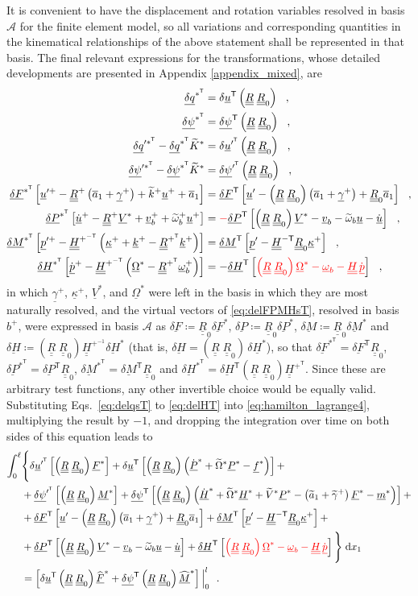 \documentclass[12pt,a4paper,oneside,english]{abntex2} %
\newcommand{\fix}[1]{{\color{red}#1}}
\newcommand{\vect}[1]{\underline{#1}}
\newcommand{\uvec}[1]{\overline{#1}}
\def\tens#1{\underline{\underline{#1}}}
\def\til#1{\widetilde{#1}}
\def\lb{\left[}
\def\rb{\right]}
\def\lp{\left(}
\def\rp{\right)}
\def\T{\mathsf{T}}
\def\A{\mathcal{A}}
\def\bp{b^+}
\def\xo{x_1}
\def\aone{\uvec{a}_1}
\def\aonetil{\til{a}_1}
\def\R{\tens{R}}
\def\Rp{\R^+}
\def\RpT{\R^{+^\T}}
\def\Rz{\R_0}
\def\u{\vect{u}}
\def\uT{\u^\T}
\def\uplus{\u^{+}}
\def\udot{\dot{\u}}
\def\updot{\dot{\u}^{+}}
\def\uprime{\u^{\prime}}
\def\uprimeT{\u^{\prime^\T}}
\def\upprime{\u^{\prime+}}
\def\vb{\vect{v}_b}
\def\vbplus{\vb^{+}}
\def\om{\vect{\omega}_b}
\def\omp{\om^{+}}
\def\omtil{\til{\omega}_b}
\def\omtilp{\omtil^{+}}
\def\gam{\vect{\gamma}}
\def\gamp{\gam^{+}}
\def\gamptil{\til{\gamma}^{+}}
\def\kap{\vect{\kappa}}
\def\kapp{\kap^{+}}
\def\k{\vect{k}}
\def\kp{\k^{+}}
\def\ktil{\til{k}}
\def\ktilp{\ktil^{+}}
\def\Ktil{\til{K}}
\def\Ktils{\Ktil^{*}}
\def\V{\vect{V}}
\def\Vs{\V^{*}}
\def\Vtils{\til{V}^{*}}
\def\Om{\vect{\Omega}}
\def\Oms{\Om^{*}}
\def\Omtil{\til{\Omega}}
\def\Omtils{\Omtil^{*}}
\def\P{\vect{P}}
\def\Ps{\P^*}
\def\Pdots{\dot{\P}^*}
\def\Hv{\vect{H}}
\def\Hvdot{\dot{\Hv}}
\def\Hvs{\Hv^*}
\def\Hvdots{\Hvdot^*}
\def\H{\tens{H}}
\def\HinvT{\H^{-\T}}
\def\HpT{\H^{+^\T}}
\def\Hpinv{\H^{+^{-1}}}
\def\HpmT{\H^{+^{-\T}}}
\def\p{\vect{p}}
\def\pprime{\p^{\prime}}
\def\pdot{\dot{\p}}
\def\ppdot{\pdot^{+}}
\def\ppprime{\p^{\prime{+}}}
\def\F{\vect{F}}
\def\Fhat{\widehat{\F}}
\def\Fhats{\Fhat^*}
\def\Fs{\F^*}
\def\M{\vect{M}}
\def\Mhat{\widehat{\M}}
\def\Mhats{\Mhat^*}
\def\Ms{\M^*}
\def\f{\vect{f}}
\def\fs{\f^*}
\def\m{\vect{m}}
\def\ms{\m^*}
\def\delF{\vect{\delta F}}
\def\delFT{\delF^\T}
\def\delM{\vect{\delta M}}
\def\delMT{\delM^\T}
\def\delP{\vect{\delta P}}
\def\delPT{\delP^\T}
\def\delH{\vect{\delta H}}
\def\delHT{\delH^\T}
\def\delFs{\delF^*}
\def\delFsT{\delF^{*^\T}}
\def\delMs{\delM^*}
\def\delMsT{\delM^{*^\T}}
\def\delPs{\delP^*}
\def\delPsT{\delP^{*^\T}}
\def\delHs{\delH^*}
\def\delHsT{\delH^{*^\T}}
\def\delq{\vect{\delta q}}
\def\delqsT{\delq^{*^\T}}
\def\delqpsT{\delq^{{\prime*}^\T}}
\def\delpsi{\vect{\delta\psi}}
\def\delpsiT{\delpsi^\T}
\def\delpsipT{\delpsi^{\prime^\T}}
\def\delpsisT{\delpsi^{*^\T}}
\def\delpsipsT{\delpsi^{\prime*^\T}}
\def\intl{\int_{0}^{\ell}}
\def\d{\textnormal{d}}
\def\RRz{\lp\R\;\Rz\rp}
\begin{document}
It is convenient to have the displacement and rotation variables resolved in basis $\A$ for the finite element model, so all variations and corresponding quantities in the kinematical relationships of the above statement shall be represented in that basis. The final relevant expressions for the transformations, whose detailed developments are presented in Appendix \ref{appendix_mixed}, are
\begin{align}
    \delqsT &= \delta\uT\RRz \ \ ,
    \label{eq:delqsT} 
    \\
    \delpsisT &= \delpsiT\RRz \ \ , \label{eq:delpsisT} 
    \\
    \delqpsT - \delqsT\Ktils &= \delta\uprimeT\RRz 
    \ \ , \label{eq:delqpsT_minus_delqsTKtils} 
    \\
    \delpsipsT - \delpsisT\Ktils &= \delpsipT\RRz \ \ , \label{eq:delpsisT_minus_delpsisTKtils} 
    \\
    \delFsT\lb\upprime-\Rp\lp\aone+\gamp\rp+\ktilp\uplus+\aone\rb 
    &= \delFT\lb\uprime-\RRz\lp\aone+\gamp\rp+\Rz\aone\rb \ \ , \label{eq:delFT} 
    \\
    \delPsT\lb\updot-\Rp\Vs+\vbplus+\omtilp\uplus\rb &= \fix{-}\delPT\lb\RRz\Vs-\vb-\omtil\u-\udot\rb \ \ , \label{eq:delPT} 
    \\
    \delMsT\lb\ppprime-\HpmT\lp\kapp+\kp-\RpT\kp\rp\rb &= \delMT\lb\pprime-\HinvT\Rz\kapp\rb \ \ , \label{eq:delMT} 
    \\
    \delHsT\lb\ppdot-\HpmT\lp\Oms-\RpT\omp\rp\rb &= -\delHT\lb\fix{\RRz\Oms-\om-\H\,\pdot}\rb \ \ , \label{eq:delHT} 
\end{align}
in which $\gamp$, $\kapp$, $\Vs$, and $\Oms$ were left in the basis in which they are most naturally resolved\fix{, and the virtual vectors of \cref{eq:delFPMHsT}, resolved in basis $\bp$, were expressed in basis $\A$ as $\delF\coloneqq\Rz\delFs$, $\delP\coloneqq\Rz\delPs$, $\delM\coloneqq\Rz\delMs$ and $\delH\coloneqq\RRz\Hpinv\delHs$ (that is, $\delH=\RRz\,\delta\Hvs$), so that $\delFsT=\delFT\Rz$, $\delPsT=\delPT\Rz$, $\delMsT=\delMT\Rz$ and $\delHsT=\delHT\RRz\HpT$. Since these are arbitrary test functions, any other invertible choice would be equally valid}. Substituting Eqs.~\eqref{eq:delqsT} to \eqref{eq:delHT} into \cref{eq:hamilton_lagrange4}, \fix{multiplying the result by $-1$,} and dropping the integration over time on both sides of this equation leads to
\begin{align}
    \intl &\Biggl\{\Biggr. \delta\uprimeT\lb\RRz\Fs\rb + \delta\uT\lb\RRz\lp\Pdots+\Omtils\Ps-\fs\rp\rb + \nonumber 
    \\
	&+\delpsipT\lb\RRz\Ms\rb + \delpsiT\lb\RRz\lp\Hvdots+\Omtils\Hvs+\Vtils\Ps-\lp\aonetil+\gamptil\rp\Fs-\ms\rp\rb + \nonumber \\
	&+\delFT\lb\uprime-\RRz\lp\aone+\gamp\rp+\Rz\aone\rb
	+\delMT\lb\pprime-\HinvT\Rz\kapp\rb
	+ \nonumber \\
	&+\delPT\lb\RRz\Vs-\vb-\omtil\u-\udot\rb
	+\delHT\lb\fix{\RRz\Oms-\om-\H\,\pdot}\rb
	\Biggl.\Biggr\}\;\d \xo
	\nonumber \\
	&= \lb \delta\uT\RRz\Fhats+\delpsiT\RRz\Mhats \rb \Big|_{0}^{l} \ \ .
    \label{eq:hamilton_lagrange5}
\end{align}
\end{document}
